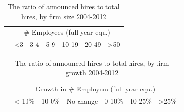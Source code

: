 \documentclass[11pt,article]{memoir}
\begin{document}
% 		






\begin{table}[h!]
\begin{center}
		\caption{The ratio of announced hires to total hires, by firm size 2004-2012}
	\label{tab:size}
	\begin{tabularx}{.65\linewidth}{X|cccccc}
	\toprule
	&\multicolumn{6}{c}{\# Employees (full year equ.)}\\
	&<3&3-4&5-9&10-19&20-49&>50\\\midrule
		
		\bottomrule
	\end{tabularx}
\end{center}
\end{table}


\begin{table}[h!]
\begin{center}
		\caption{The ratio of announced hires to total hires, by firm growth 2004-2012}
	\label{tab:growth}
	\begin{tabularx}{.85\linewidth}{X|cccccc}
	\toprule
	&\multicolumn{6}{c}{Growth in \# Employees (full year equ.)}\\
	&<-10\%&10-0\%&No change&0-10\%&10-25\%&>25\%\\\midrule
		
		\bottomrule
	\end{tabularx}
\end{center}
\end{table}



\end{document}
